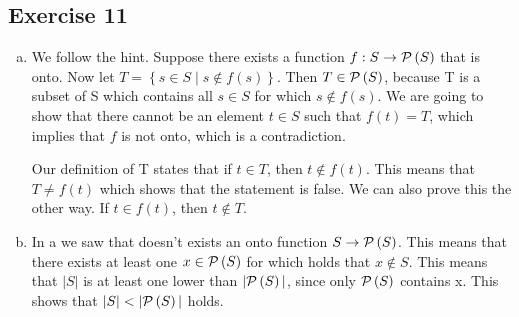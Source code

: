 \documentclass[a4paper]{article}
\newcommand{\exerciseenum}[2]{\subsection*{Exercise #1}{\begin{enumerate}[a)]#2\end{enumerate}}}
\newcommand{\set}[1]{\ensuremath{\left\{{#1}\right\}}}
\newcommand{\setbuild}[2]{\ensuremath{\set{{#1}\mid{#2}}}}
\newcommand{\power}[1]{\ensuremath{{\cal P}\left({#1}\right)}}
\begin{document}
{\begin{center}
\end{center}
}


\exerciseenum{11}{%
\item%
We follow the hint.
Suppose there exists a function $f:S\to \power{S}$ that is onto.
Now let $T = \setbuild{s\in S}{s\not\in f(s)}$.
Then $T\in \power{S}$, because T is a subset of S which contains all $s \in S$ for which $s \notin f(s)$.
We are going to show that there cannot be an element $t\in S$ such that
$f(t)=T$, which implies that $f$ is not onto, which is a contradiction.

\smallskip
Our definition of T states that if $t \in T$, then $t \notin f(t)$. This means that $T \neq f(t)$ which shows that the statement is false.
We can also prove this the other way. If $t \in f(t)$, then $t \notin T$.
\item%
In a we saw that doesn't exists an onto function $S \rightarrow \power{S}$. This means that there exists at least one $x \in \power{S}$ for which holds that $x \notin S$. This means that $|S|$ is at least one lower than $|\power{S}|$, since only $\power{S}$ contains x. This shows that $|S| < |\power{S}|$ holds.
}
\end{document}
